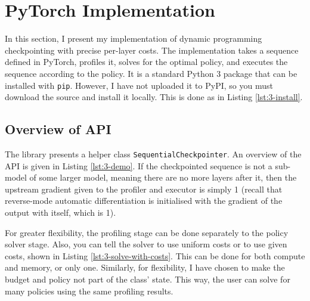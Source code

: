\section{PyTorch Implementation} \label{sec:3-pytorch-impl}
In this section, I present my implementation of dynamic programming checkpointing with precise per-layer costs.
The implementation takes a sequence defined in PyTorch, profiles it, solves for the optimal policy, and executes the sequence according to the policy.
It is a standard Python 3 package that can be installed with \texttt{pip}.
However, I have not uploaded it to PyPI, so you must download the source and install it locally.
This is done as in Listing \ref{lst:3-install}.


\subsection{Overview of API}
The library presents a helper class \texttt{SequentialCheckpointer}.
An overview of the API is given in Listing \ref{lst:3-demo}.
If the checkpointed sequence is not a sub-model of some larger model, meaning there are no more layers after it, then the upstream gradient given to the profiler and executor is simply 1 (recall that reverse-mode automatic differentiation is initialised with the gradient of the output with itself, which is 1).


For greater flexibility, the profiling stage can be done separately to the policy solver stage.
Also, you can tell the solver to use uniform costs or to use given costs, shown in Listing \ref{lst:3-solve-with-costs}.
This can be done for both compute and memory, or only one.
Similarly, for flexibility, I have chosen to make the budget and policy not part of the class' state.
This way, the user can solve for many policies using the same profiling results.

